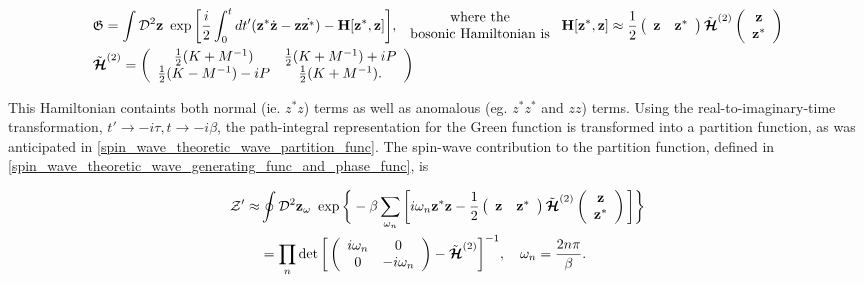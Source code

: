 \documentclass{homework}
\begin{document}
\begin{equation}
\begin{split}
    &\mathfrak{G} = \int \mathcal{D}^2 {\bf z} \textnormal{ } \exp \bigg[\frac{i}{2} \int_{0}^{t} dt'({\bf z}^{*}\dot{{\bf z}} - {\bf z}\dot{{\bf z}^{*}}) - {\bf H}[{\bf z}^{*}, {\bf z}] \bigg], \begin{array}{cc}
         \textnormal{ where the }  \\
         \textnormal{ bosonic Hamiltonian is } 
    \end{array} {\bf H}[{\bf z}^{*}, {\bf z}] \approx \frac{1}{2} \left(\begin{array}{cc}
          {\bf z} & {\bf z}^{*}
    \end{array}\right) \tilde{\bm{\mathcal{H}}}^{(2)} \left( \begin{array}{c}
          {\bf z} \\
          {\bf z}^{*}
    \end{array}\right) \\
    & \tilde{\bm{\mathcal{H}}}^{(2)} = \left(\begin{array}{cc}
         \frac{1}{2} (K+M^{-1}) & \frac{1}{2} (K+M^{-1}) + iP  \\
         \frac{1}{2} (K-M^{-1}) -iP & \frac{1}{2} (K+M^{-1}).
    \end{array}\right)
\end{split}
\label{spin_wave_path_int_bosonic_cohr_rep}
\end{equation}

This Hamiltonian containts both normal (ie. $z^* z$) terms as well as anomalous (eg. $z^* z^*$ and $zz$) terms. Using the real-to-imaginary-time transformation, $t' \rightarrow -i\tau, t \rightarrow -i\beta$, the path-integral representation for the Green function is transformed into a partition function, as was anticipated in \cref{spin_wave_theoretic_wave_partition_func}. The spin-wave contribution to the partition function, defined in \cref{spin_wave_theoretic_wave_generating_func_and_phase_func}, is 

\begin{equation}
\begin{split}
    \mathcal{Z}' \approx& \oint \mathcal{D}^2 {\bf z}_\omega \textnormal{ } \exp \bigg\{-\beta \sum_{\omega_n} \bigg[i \omega_n {\bf z}^* {\bf z} - \frac{1}{2} \left(\begin{array}{cc}
          {\bf z} & {\bf z}^{*}
    \end{array}\right) \tilde{\bm{\mathcal{H}}}^{(2)} \left( \begin{array}{c}
          {\bf z} \\
          {\bf z}^{*}
    \end{array}\right) \bigg]\bigg\} \\
    &= \prod_n \det \bigg[\left(\begin{array}{cc}
        i \omega_n & 0  \\
        0 & -i\omega_n
    \end{array}\right) - \tilde{\bm{\mathcal{H}}}^{(2)} \bigg]^{-1}, \quad \omega_n = \frac{2n\pi}{\beta}. 
\end{split}
\label{spin_wave_path_int_partition_function}
\end{equation}
\end{document}
